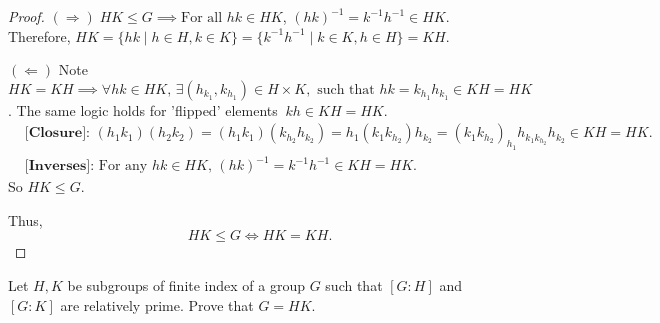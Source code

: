 \documentclass[addpoints,10pt]{exam}
\theoremstyle{plain}
\theoremstyle{definition}
\newtheorem{prob}[thm]{Problem}
\theoremstyle{plain}
\theoremstyle{plain}
\theoremstyle{definition}
\let\oldprob\prob
\let\endoldprob\endprob
\renewenvironment{prob}
  {\begin{singlespace}\oldprob}
  {\endoldprob\end{singlespace}}
\newcommand{\belowtitle}{\leavevmode\newline}
\newcommand{\Observe}{\text{Observe.}}
\newcommand{\IF}{\mathbf{(\Rightarrow)}}
\newcommand{\FI}{\mathbf{(\Leftarrow)}}
\begin{document}
\begin{proof}\belowtitle
  $\IF\;HK\leq G\implies\text{For all }hk\in HK$, $(hk)^{-1}=k^{-1}h^{-1}\in HK$. Therefore, $HK=\{hk\mid h\in H, k\in K\}=\{k^{-1}h^{-1}\mid k\in K,h\in H\}=KH$.

  $\FI$ Note $HK=KH\implies \forall hk\in HK,\,\exists (h_{k_{1}},k_{h_{1}})\in H\times K, \text{ such that }hk=k_{h_{1}}h_{k_{1}}\in KH=HK$. The same logic holds for 'flipped' elements$\;\;kh\in KH=HK$. \Observe
  \begin{align*}
    &\textbf{[Closure]: } (h_{1}k_{1})(h_{2}k_{2})=(h_{1}k_{1})(k_{h_{2}}h_{k_{2}})=h_{1}(k_{1}k_{h_{2}})h_{k_{2}}=(k_{1}k_{h_{2}})_{h_{1}}h_{k_{1}k_{h_{2}}}h_{k_{2}}\in KH=HK.\\
    &\textbf{[Inverses]: }\text{For any }hk\in HK,\,(hk)^{-1}=k^{-1}h^{-1}\in KH=HK.
  \end{align*}
  So $HK\leq G$.

  Thus,
  $$HK\leq G\iff HK=KH.$$
\end{proof}
\newpage

\begin{prob}
  Let $H,K$ be subgroups of finite index of a group $G$ such that $[G:H]$ and $[G:K]$ are relatively prime. Prove that $G=HK$.
\end{prob}
\end{document}
